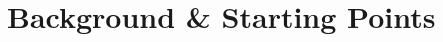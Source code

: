 
\chapter{Background \& Starting Points}\label{ch:theoretical-concepts} %

%

\pagebreak

\pagebreak

\pagebreak

\pagebreak
%
